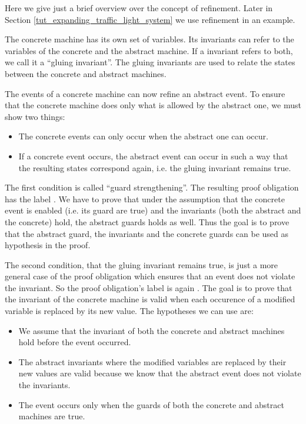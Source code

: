 Here we give just a brief overview over the concept of refinement. Later in Section \ref{tut_expanding_traffic_light_system}
we use refinement in an example.

The concrete machine has its own set of variables. Its invariants can refer to
the variables of the concrete and the abstract machine. If a invariant refers to both,
we call it a ``gluing invariant''. The gluing invariants are
used to relate the states between the concrete and abstract machines.

The events of a concrete machine can now refine an abstract event. To ensure that the concrete machine 
does only what is allowed by the abstract one, we must show two things:
\begin{itemize}
\item The concrete events can only occur when the abstract one can occur.
\item If a concrete event occurs, the abstract event can occur in such a way that the resulting
  states correspond again, i.e. the gluing invariant remains true.
\end{itemize}

The first condition is called ``guard strengthening''. The resulting proof obligation has the label
. We have to prove that under the assumption that the
concrete event is enabled (i.e. its guard are true) and the invariants (both the abstract and the concrete) 
hold, the abstract guards holds as well. Thus the goal is to prove that the abstract guard, the invariants and the
concrete guards can be used as hypothesis in the proof.

The second condition, that the gluing invariant remains true, is just a more general case of the proof obligation which ensures 
that an event does not violate the invariant. So the proof obligation's label is again 
. The goal is to prove that the invariant of the concrete machine is valid when each occurence of a modified variable is replaced by its new value.
The hypotheses we can use are:
\begin{itemize}
\item We assume that the invariant of both the concrete and abstract machines hold before the event occurred.
\item The abstract invariants where the modified variables are replaced by their new values are valid because we know that the abstract event does not violate the invariants.
\item The event occurs only when the guards of both the concrete and abstract machines are true.
\end{itemize}

